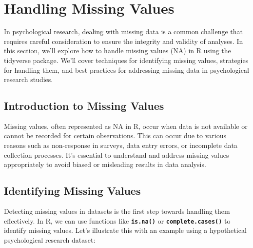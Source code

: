 \documentclass[
]{book}
\begin{document}
\hypertarget{handling-missing-values}{%
\section{Handling Missing Values}\label{handling-missing-values}}

In psychological research, dealing with missing data is a common challenge that requires careful consideration to ensure the integrity and validity of analyses. In this section, we'll explore how to handle missing values (NA) in R using the tidyverse package. We'll cover techniques for identifying missing values, strategies for handling them, and best practices for addressing missing data in psychological research studies.

\hypertarget{introduction-to-missing-values}{%
\subsection{\texorpdfstring{\textbf{Introduction to Missing Values}}{Introduction to Missing Values}}\label{introduction-to-missing-values}}

Missing values, often represented as NA in R, occur when data is not available or cannot be recorded for certain observations. This can occur due to various reasons such as non-response in surveys, data entry errors, or incomplete data collection processes. It's essential to understand and address missing values appropriately to avoid biased or misleading results in data analysis.

\hypertarget{identifying-missing-values}{%
\subsection{\texorpdfstring{\textbf{Identifying Missing Values}}{Identifying Missing Values}}\label{identifying-missing-values}}

Detecting missing values in datasets is the first step towards handling them effectively. In R, we can use functions like \textbf{\texttt{is.na()}} or \textbf{\texttt{complete.cases()}} to identify missing values. Let's illustrate this with an example using a hypothetical psychological research dataset:
\end{document}
